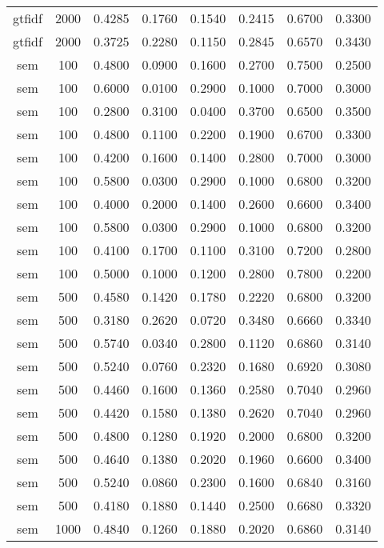 \begin{scriptsize}
\begin{longtable}{cccccccc}
		gtfidf   & 2000 & 0.4285 & 0.1760 & 0.1540 & 0.2415 & 0.6700 & 0.3300 \\
		gtfidf   & 2000 & 0.3725 & 0.2280 & 0.1150 & 0.2845 & 0.6570 & 0.3430 \\
		sem      & 100  & 0.4800 & 0.0900 & 0.1600 & 0.2700 & 0.7500 & 0.2500 \\
		sem      & 100  & 0.6000 & 0.0100 & 0.2900 & 0.1000 & 0.7000 & 0.3000 \\
		sem      & 100  & 0.2800 & 0.3100 & 0.0400 & 0.3700 & 0.6500 & 0.3500 \\
		sem      & 100  & 0.4800 & 0.1100 & 0.2200 & 0.1900 & 0.6700 & 0.3300 \\
		sem      & 100  & 0.4200 & 0.1600 & 0.1400 & 0.2800 & 0.7000 & 0.3000 \\
		sem      & 100  & 0.5800 & 0.0300 & 0.2900 & 0.1000 & 0.6800 & 0.3200 \\
		sem      & 100  & 0.4000 & 0.2000 & 0.1400 & 0.2600 & 0.6600 & 0.3400 \\
		sem      & 100  & 0.5800 & 0.0300 & 0.2900 & 0.1000 & 0.6800 & 0.3200 \\
		sem      & 100  & 0.4100 & 0.1700 & 0.1100 & 0.3100 & 0.7200 & 0.2800 \\
		sem      & 100  & 0.5000 & 0.1000 & 0.1200 & 0.2800 & 0.7800 & 0.2200 \\
		sem      & 500  & 0.4580 & 0.1420 & 0.1780 & 0.2220 & 0.6800 & 0.3200 \\
		sem      & 500  & 0.3180 & 0.2620 & 0.0720 & 0.3480 & 0.6660 & 0.3340 \\
		sem      & 500  & 0.5740 & 0.0340 & 0.2800 & 0.1120 & 0.6860 & 0.3140 \\
		sem      & 500  & 0.5240 & 0.0760 & 0.2320 & 0.1680 & 0.6920 & 0.3080 \\
		sem      & 500  & 0.4460 & 0.1600 & 0.1360 & 0.2580 & 0.7040 & 0.2960 \\
		sem      & 500  & 0.4420 & 0.1580 & 0.1380 & 0.2620 & 0.7040 & 0.2960 \\
		sem      & 500  & 0.4800 & 0.1280 & 0.1920 & 0.2000 & 0.6800 & 0.3200 \\
		sem      & 500  & 0.4640 & 0.1380 & 0.2020 & 0.1960 & 0.6600 & 0.3400 \\
		sem      & 500  & 0.5240 & 0.0860 & 0.2300 & 0.1600 & 0.6840 & 0.3160 \\
		sem      & 500  & 0.4180 & 0.1880 & 0.1440 & 0.2500 & 0.6680 & 0.3320 \\
		sem      & 1000 & 0.4840 & 0.1260 & 0.1880 & 0.2020 & 0.6860 & 0.3140 \\

\end{longtable}
\end{scriptsize}
